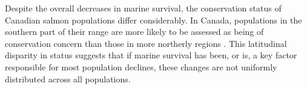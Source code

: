 \documentclass[12pt]{article}
\begin{document}


Despite the overall decreases in marine survival,
the conservation status of Canadian salmon populations differ
considerably. In Canada, populations in the southern part of their range are more
likely to be assessed as being of conservation concern than those in more
northerly regions \citep{Cosewic2010}. This latitudinal disparity in status
suggests that if marine survival has been, or is, a key factor responsible for
most population declines, these changes are not uniformly distributed across
all populations. 


\end{document}
